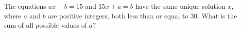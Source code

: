 The equations $ax+b=15$ and $15x+a=b$ have the same unique solution $x$, where $a$ and $b$ are positive integers, both less than or equal to $30$. What is the sum of all possible values of $a$?
